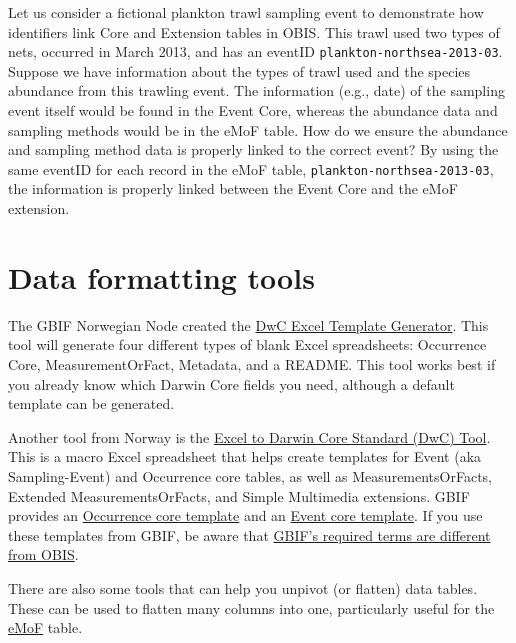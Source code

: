 \documentclass[
  letterpaper,
  DIV=11,
  numbers=noendperiod,
  oneside]{scrreprt}
\begin{document}
Let us consider a fictional plankton trawl sampling event to demonstrate
how identifiers link Core and Extension tables in OBIS. This trawl used
two types of nets, occurred in March 2013, and has an eventID
\texttt{plankton-northsea-2013-03}. Suppose we have information about
the types of trawl used and the species abundance from this trawling
event. The information (e.g., date) of the sampling event itself would
be found in the Event Core, whereas the abundance data and sampling
methods would be in the eMoF table. How do we ensure the abundance and
sampling method data is properly linked to the correct event? By using
the same eventID for each record in the eMoF table,
\texttt{plankton-northsea-2013-03}, the information is properly linked
between the Event Core and the eMoF extension.

\hypertarget{data-formatting-tools}{%
\section{Data formatting tools}\label{data-formatting-tools}}

The GBIF Norwegian Node created the
\href{https://gbif-norway.github.io/dwc-excel-template-generator-js/}{DwC
Excel Template Generator}. This tool will generate four different types
of blank Excel spreadsheets: Occurrence Core, MeasurementOrFact,
Metadata, and a README. This tool works best if you already know which
Darwin Core fields you need, although a default template can be
generated.

Another tool from Norway is the
\href{https://zenodo.org/record/6453921\#.Y9KsQkHMKmU}{Excel to Darwin
Core Standard (DwC) Tool}. This is a macro Excel spreadsheet that helps
create templates for Event (aka Sampling-Event) and Occurrence core
tables, as well as MeasurementsOrFacts, Extended MeasurementsOrFacts,
and Simple Multimedia extensions. GBIF provides an
\href{https://ipt.gbif.org/manual/en/ipt/latest/occurrence-data\#templates}{Occurrence
core template} and an
\href{https://ipt.gbif.org/manual/en/ipt/latest/sampling-event-data\#templates}{Event
core template}. If you use these templates from GBIF, be aware that
\protect\hyperlink{differences-between-obis-and-gbif-publication-processes}{GBIF's
required terms are different from OBIS}.

There are also some tools that can help you unpivot (or flatten) data
tables. These can be used to flatten many columns into one, particularly
useful for the \href{format_emof.html}{eMoF} table.
\end{document}
